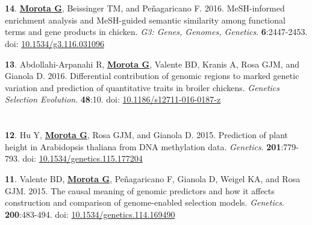 \documentclass[margin,line,10pt]{res}
\newenvironment{list1}{
  \begin{list}{\ding{113}}{%
      \setlength{\itemsep}{0in}
      \setlength{\parsep}{0in} \setlength{\parskip}{0in}
      \setlength{\topsep}{0in} \setlength{\partopsep}{0in} 
      \setlength{\leftmargin}{0.17in}}}{\end{list}}
\begin{document}
\begin{resume}
\begin{list1}
\end{list1}



\section{}

\begin{list1}

  \item [{\bf 14}.]  \textbf{\underline{Morota G}}, Beissinger TM, and Pe\~{n}agaricano F. 2016. MeSH-informed enrichment analysis and MeSH-guided semantic similarity among functional terms and gene products in chicken. \emph{G3: Genes, Genomes, Genetics}. \textbf{6}:2447-2453. doi: \textcolor{blue}{\href{http://dx.doi.org/10.1534/g3.116.031096}{10.1534/g3.116.031096}}  

\vspace{0.5cm}

  \item [{\bf 13}.] Abdollahi-Arpanahi R, {\bf \underline{Morota G}}, Valente BD, Kranis A, Rosa GJM, and Gianola D. 
  2016. Differential contribution of genomic regions to marked genetic variation and prediction of quantitative traits in broiler chickens. \emph{Genetics Selection Evolution}. \textbf{48}:10. doi: \textcolor{blue}{\href{http://dx.doi.org/10.1186/s12711-016-0187-z}{10.1186/s12711-016-0187-z}}

\end{list1}
  
\section{}

\begin{list1}

\item [{\bf 12}.]  Hu Y, {\bf \underline{Morota G}}, Rosa GJM, and Gianola D. 2015. Prediction of plant height in Arabidopsis thaliana from DNA methylation data. \emph{Genetics}. \textbf{201}:779-793. doi: \textcolor{blue}{\href{http://dx.doi.org/10.1534/genetics.115.177204}{10.1534/genetics.115.177204}} 

\vspace{0.5cm}

\item [{\bf 11}.]  Valente BD, {\bf \underline{Morota G}}, Pe\~{n}agaricano F, Gianola D, Weigel KA, and Rosa GJM. 2015. The causal meaning of genomic predictors and how it affects  construction and comparison of genome-enabled selection models. \emph{Genetics}. \textbf{200}:483-494. doi: \textcolor{blue}{\href{http://dx.doi.org/10.1534/genetics.114.169490}{10.1534/genetics.114.169490}} 


\end{list1}
\end{resume}
\end{document}
